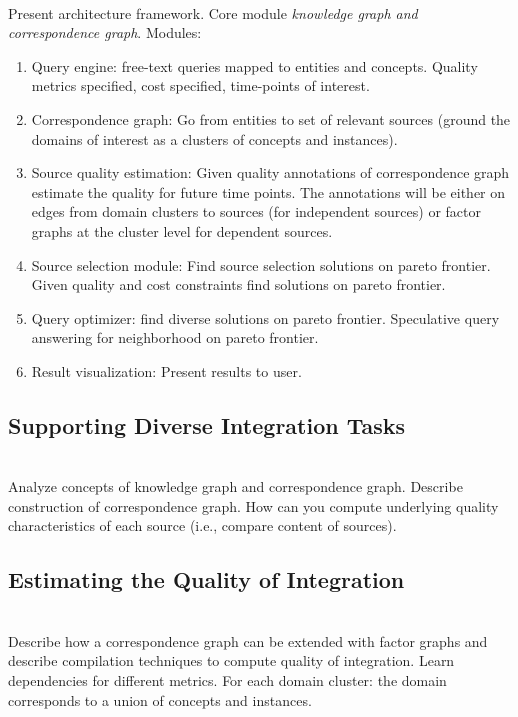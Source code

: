 \documentclass{sig-alternate}
\begin{document}
\ \\Present architecture framework. Core module {\em knowledge graph and correspondence graph}. Modules:
\begin{enumerate}
\item Query engine: free-text queries mapped to entities and concepts. Quality metrics specified, cost specified, time-points of interest. 
\item Correspondence graph: Go from entities to set of relevant sources (ground the domains of interest as a clusters of concepts and instances). 
\item Source quality estimation: Given quality annotations of correspondence graph estimate the quality for future time points. The annotations will be either on edges from domain clusters to sources (for independent sources) or factor graphs at the cluster level for dependent sources. 
\item Source selection module: Find source selection solutions on pareto frontier. Given quality and cost constraints find solutions on pareto frontier. 
\item Query optimizer: find diverse solutions on pareto frontier. Speculative query answering for neighborhood on pareto frontier. 
\item Result visualization: Present results to user. 
\end{enumerate}

\subsection{Supporting Diverse Integration Tasks}

\ \\Analyze concepts of knowledge graph and correspondence graph. Describe construction of correspondence graph. How can you compute underlying quality characteristics of each source (i.e., compare content of sources).

\subsection{Estimating the Quality of Integration}

\ \\Describe how a correspondence graph can be extended with factor graphs and describe compilation techniques to compute quality of integration. Learn dependencies for different metrics. For each domain cluster: the domain corresponds to a union of concepts and instances. 
\end{document}

